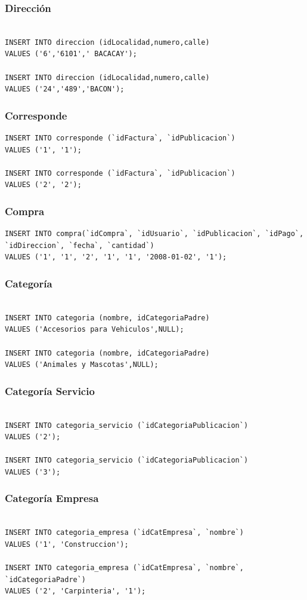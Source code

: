 \documentclass[a4paper, 10pt, twoside]{article}
\begin{document}
\subsubsection{Direcci\'on}
\begin{verbatim}

INSERT INTO direccion (idLocalidad,numero,calle) 
VALUES ('6','6101',' BACACAY');

INSERT INTO direccion (idLocalidad,numero,calle) 
VALUES ('24','489','BACON');
\end{verbatim}
\subsubsection{Corresponde}
\begin{verbatim}
INSERT INTO corresponde (`idFactura`, `idPublicacion`) 
VALUES ('1', '1');

INSERT INTO corresponde (`idFactura`, `idPublicacion`) 
VALUES ('2', '2');
\end{verbatim}
\subsubsection{Compra}
\begin{verbatim}
INSERT INTO compra(`idCompra`, `idUsuario`, `idPublicacion`, `idPago`, 
`idDireccion`, `fecha`, `cantidad`) 
VALUES ('1', '1', '2', '1', '1', '2008-01-02', '1');
\end{verbatim}
\subsubsection{Categor\'ia}
\begin{verbatim}

INSERT INTO categoria (nombre, idCategoriaPadre) 
VALUES ('Accesorios para Vehiculos',NULL);

INSERT INTO categoria (nombre, idCategoriaPadre) 
VALUES ('Animales y Mascotas',NULL);
\end{verbatim}
\subsubsection{Categor\'ia Servicio}
\begin{verbatim}

INSERT INTO categoria_servicio (`idCategoriaPublicacion`) 
VALUES ('2');

INSERT INTO categoria_servicio (`idCategoriaPublicacion`) 
VALUES ('3');
\end{verbatim}
\subsubsection{Categor\'ia Empresa}
\begin{verbatim}

INSERT INTO categoria_empresa (`idCatEmpresa`, `nombre`) 
VALUES ('1', 'Construccion');

INSERT INTO categoria_empresa (`idCatEmpresa`, `nombre`, `idCategoriaPadre`) 
VALUES ('2', 'Carpinteria', '1');
\end{verbatim}
\end{document}
